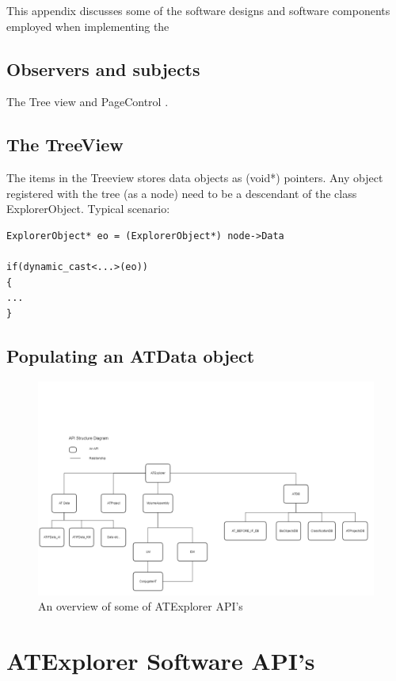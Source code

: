 \documentclass[11pt,fleqn]{book} %
\begin{document}
\begin{appendices}
This appendix discusses some of the software designs and software components employed when implementing the \ate


\subsection{Observers and subjects}
The Tree view and PageControl .


\subsection{The TreeView}
The items in the Treeview stores data objects as (void*) pointers. Any object registered with the tree (as a node) need to be a descendant of the class ExplorerObject.
Typical scenario:
\begin{verbatim}
ExplorerObject* eo = (ExplorerObject*) node->Data

if(dynamic_cast<...>(eo))
{
...
}
\end{verbatim}

\subsection{Populating an ATData object}

\begin{figure}[h]
\centering\includegraphics[scale=0.35]{ATExplorer_APIs}
\caption{An overview of some of ATExplorer API's}
\end{figure}


\section{ATExplorer Software API's}

\end{appendices}
\end{document}
